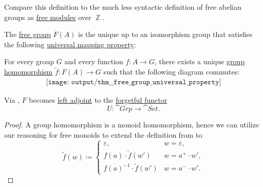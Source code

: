 \begin{comments}
  \item Compare this definition to the much less syntactic definition of free abelian groups as \hyperref[def:free_semimodule]{free modules} over \( \BbbZ \).
\end{comments}

\begin{theorem}\label{thm:free_group_universal_property}
  The \hyperref[def:free_group]{free group} \( F(A) \) is the unique up to an isomorphism group that satisfies the following \hyperref[rem:universal_mapping_property]{universal mapping property}:
  \begin{displayquote}
    For every group \( G \) and every function \( f: A \to G \), there exists a unique \hyperref[def:group/homomorphism]{group homomorphism} \( \widetilde{f}: F(A) \to G \) such that the following diagram commutes:
    \begin{equation}\label{eq:thm:free_group_universal_property/diagram}
      \begin{aligned}
        \texttt{[image: output/thm\_\_free\_group\_universal\_property]}
      \end{aligned}
    \end{equation}
  \end{displayquote}
\end{theorem}
\begin{comments}
  \item Via , \( F \) becomes \hyperref[def:category_adjunction]{left adjoint} to the \hyperref[def:concrete_category]{forgetful functor}
  \begin{equation*}
    U: \cat{Grp} \to \cat{Set}.
  \end{equation*}
\end{comments}
\begin{proof}
  A group homomorphism is a monoid homomorphism, hence we can utilize our reasoning for free monoids to extend the definition from  to
  \begin{equation*}
    \widetilde{f}(w) \coloneqq \begin{cases}
      \varepsilon,                      &w = \varepsilon, \\
      f(a) \cdot \widetilde{f}(w')      &w = a^+ \cdot w', \\
      f(a)^{-1} \cdot \widetilde{f}(w') &w = a^- \cdot w'.
    \end{cases}
  \end{equation*}
\end{proof}


